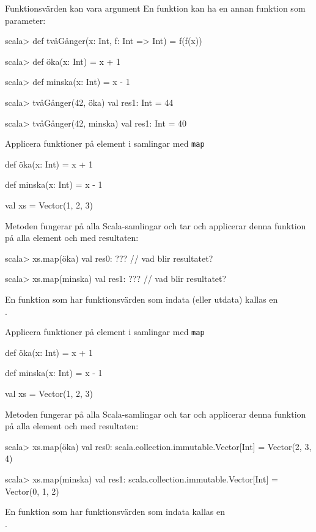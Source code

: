\begin{Slide}{Funktionsvärden kan vara argument}
En funktion kan ha en annan funktion som parameter:
\begin{REPL}
scala> def tvåGånger(x: Int, f: Int => Int) = f(f(x))

scala> def öka(x: Int) = x + 1

scala> def minska(x: Int) = x - 1

scala> tvåGånger(42, öka)
val res1: Int = 44

scala> tvåGånger(42, minska)
val res1: Int = 40
\end{REPL}
\end{Slide}



\begin{Slide}{Applicera funktioner på element i samlingar med \texttt{map}}\SlideFontSmall
\begin{Code}
def öka(x: Int) = x + 1

def minska(x: Int) = x - 1

val xs = Vector(1, 2, 3)
\end{Code}
\pause
Metoden  fungerar på alla Scala-samlingar och tar  och applicerar denna funktion på alla element och  med resultaten:
\begin{REPL}
scala> xs.map(öka)
val res0: ???   // vad blir resultatet?

scala> xs.map(minska)
val res1: ???   // vad blir resultatet?
\end{REPL}
En funktion som har funktionsvärden som indata (eller utdata) kallas en\\   .
\end{Slide}


\begin{Slide}{Applicera funktioner på element i samlingar med \texttt{map}}\SlideFontSmall
\begin{Code}
def öka(x: Int) = x + 1

def minska(x: Int) = x - 1

val xs = Vector(1, 2, 3)
\end{Code}
Metoden  fungerar på alla Scala-samlingar och tar  och applicerar denna funktion på alla element och  med resultaten:
\begin{REPL}
scala> xs.map(öka)
val res0: scala.collection.immutable.Vector[Int] = Vector(2, 3, 4)

scala> xs.map(minska)
val res1: scala.collection.immutable.Vector[Int] = Vector(0, 1, 2)
\end{REPL}
En funktion som har funktionsvärden som indata kallas en\\   .
\end{Slide}

